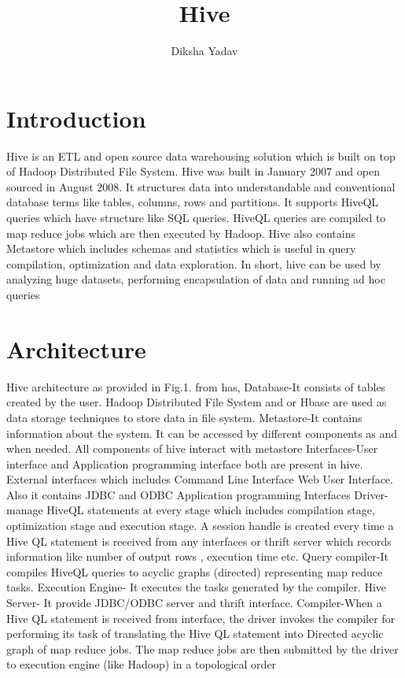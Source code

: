 \documentclass[9pt,twocolumn,twoside]{../../styles/osajnl}
\title{Hive}
\author[1,*, +]{Diksha Yadav}
\affil[1]{School of Informatics and Computing, Bloomington, IN 47408, U.S.A.}
\affil[*]{Corresponding authors: yadavd@umail.iu.edu}
\affil[+]{HID - S17-IR-2044}
\begin{document}
\maketitle

\section{Introduction}
Hive is an ETL and open source data warehousing solution which is built on top of Hadoop Distributed File System. Hive was built in January 2007 and open sourced in August 2008.
 It structures data into understandable and conventional database terms like tables, columns, rows and partitions. It supports HiveQL queries which have structure like SQL queries. HiveQL queries are compiled to map reduce jobs which are then executed by Hadoop. Hive also contains Metastore which includes schemas and statistics which is useful in query compilation, optimization and data exploration. In short, hive can be used by analyzing huge datasets, performing encapsulation of data and running ad hoc queries \cite{wk}

\section{Architecture}
Hive architecture as provided in Fig.1. from \cite{td} has, 
Database-It consists of tables created by the user.
Hadoop Distributed File System and or Hbase are used as data storage techniques to store data in file system.
Metastore-It contains information about the system. It can be accessed by different components as and when needed. All components of hive interact with metastore
Interfaces-User interface and Application programming interface both are present in hive.
External interfaces which includes Command Line Interface Web User Interface. Also it contains JDBC and ODBC Application programming Interfaces
Driver-manage HiveQL statements at every stage which includes compilation stage, optimization stage and execution stage. A session handle is created every time a Hive QL statement is received from any interfaces or thrift server which records information like number of output rows , execution time etc.
Query compiler-It compiles HiveQL queries to acyclic graphs (directed) representing map reduce tasks.
Execution Engine- It executes the tasks generated by the compiler.
Hive Server- It provide JDBC/ODBC server and thrift interface.
Compiler-When a Hive QL statement is received from interface, the driver invokes the compiler for performing its task of translating the Hive QL statement into Directed acyclic graph of map reduce jobs.
The map reduce jobs are then submitted by the driver to execution engine (like Hadoop) in a topological order \cite{td}
\end{document}
